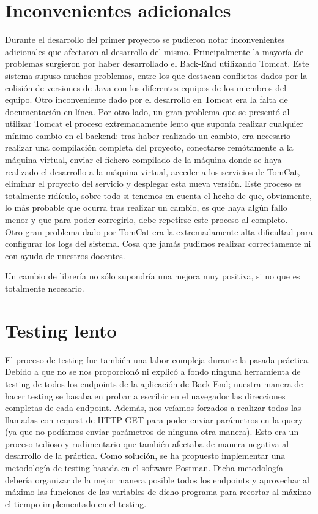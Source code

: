 \documentclass[12pt]{report}
\begin{document}
\section{Inconvenientes adicionales} %
Durante el desarrollo del primer proyecto se pudieron notar inconvenientes adicionales que afectaron al desarrollo del mismo.
Principalmente la mayoría de problemas surgieron por haber desarrollado el Back-End utilizando Tomcat.
Este sistema supuso muchos problemas, entre los que destacan conflictos dados por la colisión de versiones de Java con los diferentes equipos de los miembros del equipo.
Otro inconveniente dado por el desarrollo en Tomcat era la falta de documentación en línea.
Por otro lado, un gran problema que se presentó al utilizar Tomcat el proceso extremadamente lento que suponía realizar cualquier mínimo cambio en el backend: tras haber realizado un cambio, era necesario realizar una compilación completa del proyecto, conectarse remótamente a la máquina virtual, enviar el fichero compilado de la máquina donde se haya realizado el desarrollo a la máquina virtual, acceder a los servicios de TomCat, eliminar el proyecto del servicio y desplegar esta nueva versión. Este proceso es totalmente ridículo, sobre todo si tenemos en cuenta el hecho de que, obviamente, lo más probable que ocurra tras realizar un cambio, es que haya algún fallo menor y que para poder corregirlo, debe repetirse este proceso al completo.\\
Otro gran problema dado por TomCat era la extremadamente alta dificultad para configurar los logs del sistema. Cosa que jamás pudimos realizar correctamente ni con ayuda de nuestros docentes.

Un cambio de librería no sólo supondría una mejora muy positiva, si no que es totalmente necesario.
\section{Testing lento}
El proceso de testing fue también una labor compleja durante la pasada práctica. Debido a que no se nos proporcionó ni explicó a fondo ninguna herramienta de testing de todos los endpoints de la aplicación de Back-End; nuestra manera de hacer testing se basaba en probar a escribir en el navegador las direcciones completas de cada endpoint. Además, nos veíamos forzados a realizar todas las llamadas con request de HTTP GET para poder enviar parámetros en la query (ya que no podíamos enviar parámetros de ninguna otra manera). Esto era un proceso tedioso y rudimentario que también afectaba de manera negativa al desarrollo de la práctica.
Como solución, se ha propuesto implementar una metodología de testing basada en el software Postman. Dicha metodología debería organizar de la mejor manera posible todos los endpoints y aprovechar al máximo las funciones de las variables de dicho programa para recortar al máximo el tiempo implementado en el testing.
\end{document}
